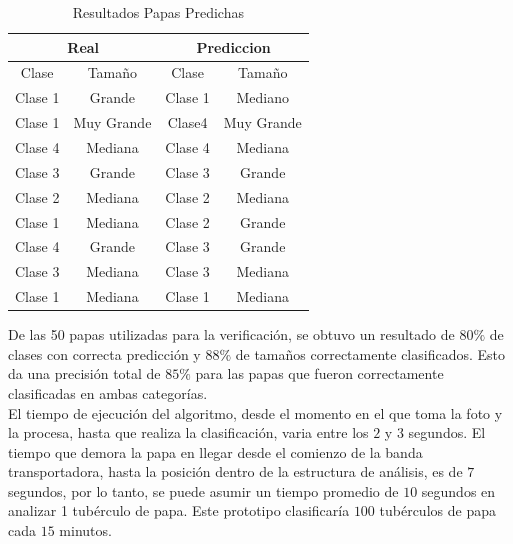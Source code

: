 	\begin{table}[ht]
		\centering
		\begin{tabular}{|cc|cc|}
			\hline
			\multicolumn{2}{|c|}{Real}                 & \multicolumn{2}{c|}{Prediccion}           \\ \hline
			\multicolumn{1}{|c|}{Clase}   & Tamaño     & \multicolumn{1}{c|}{Clase}   & Tamaño     \\ \hline
			\multicolumn{1}{|c|}{Clase 1} & Grande     & \multicolumn{1}{c|}{Clase 1} & Mediano    \\ \hline
			\multicolumn{1}{|c|}{Clase 1} & Muy Grande & \multicolumn{1}{c|}{Clase4}  & Muy Grande \\ \hline
			\multicolumn{1}{|c|}{Clase 4} & Mediana    & \multicolumn{1}{c|}{Clase 4} & Mediana    \\ \hline
			\multicolumn{1}{|c|}{Clase 3} & Grande     & \multicolumn{1}{c|}{Clase 3} & Grande     \\ \hline
			\multicolumn{1}{|c|}{Clase 2} & Mediana    & \multicolumn{1}{c|}{Clase 2} & Mediana    \\ \hline
			\multicolumn{1}{|c|}{Clase 1} & Mediana    & \multicolumn{1}{c|}{Clase 2} & Grande     \\ \hline
			\multicolumn{1}{|c|}{Clase 4} & Grande     & \multicolumn{1}{c|}{Clase 3} & Grande     \\ \hline
			\multicolumn{1}{|c|}{Clase 3} & Mediana    & \multicolumn{1}{c|}{Clase 3} & Mediana    \\ \hline
			\multicolumn{1}{|c|}{Clase 1} & Mediana    & \multicolumn{1}{c|}{Clase 1} & Mediana    \\ \hline
		\end{tabular}
		\caption{Resultados Papas Predichas}
		\label{table:res}
	\end{table}
	
	
	De las 50 papas utilizadas para la verificación, se obtuvo un resultado de $80\%$ de clases con correcta predicción y $88\%$ de tamaños correctamente clasificados. Esto da una precisión total de $85\%$ para las papas que fueron correctamente clasificadas en ambas categorías.\\
	
	El tiempo de ejecución del algoritmo, desde el momento en el que toma la foto y la procesa, hasta que realiza la clasificación, varia entre los $2$ y $3$ segundos. El tiempo que demora la papa en llegar desde el comienzo de la banda transportadora, hasta la posición dentro de la estructura de análisis, es de $7$ segundos, por lo tanto, se puede asumir un tiempo promedio de $10$ segundos en analizar 1 tubérculo de papa. Este prototipo clasificaría $100$ tubérculos de papa cada $15$ minutos.	 	

